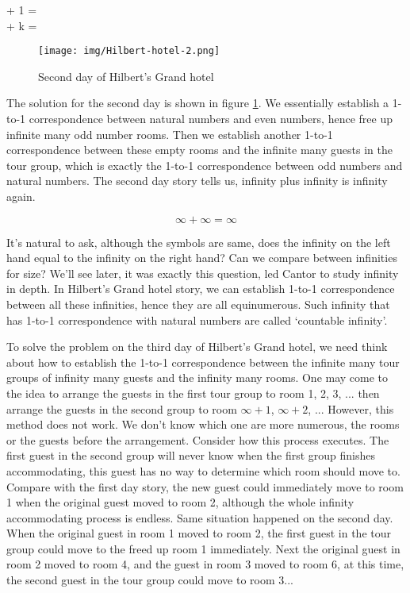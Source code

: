 \documentclass{article}
\begin{document}
\bean
\infty + 1 = \infty \\
\infty + k = \infty \\
\eean

\begin{figure}[htbp]
 \centering
 \texttt{[image: img/Hilbert-hotel-2.png]}
 \caption{Second day of Hilbert's Grand hotel}
 \label{fig:Hilbert-hotel-2}
\end{figure}

The solution for the second day is shown in figure \ref{fig:Hilbert-hotel-2}. We essentially establish a 1-to-1 correspondence between natural numbers and even numbers, hence free up infinite many odd number rooms. Then we establish another 1-to-1 correspondence between these empty rooms and the infinite many guests in the tour group, which is exactly the 1-to-1 correspondence between odd numbers and natural numbers. The second day story tells us, infinity plus infinity is infinity again.

\[
\infty + \infty = \infty
\]

It's natural to ask, although the symbols are same, does the infinity on the left hand equal to the infinity on the right hand? Can we compare between infinities for size? We'll see later, it was exactly this question, led Cantor to study infinity in depth. In Hilbert's Grand hotel story, we can establish 1-to-1 correspondence between all these infinities, hence they are all equinumerous. Such infinity that has 1-to-1 correspondence with natural numbers are called `countable infinity'.

To solve the problem on the third day of Hilbert's Grand hotel, we need think about how to establish the 1-to-1 correspondence between the infinite many tour groups of infinity many guests and the infinity many rooms. One may come to the idea to arrange the guests in the first tour group to room 1, 2, 3, ... then arrange the guests in the second group to room $\infty + 1$, $\infty + 2$, ... However, this method does not work. We don't know which one are more numerous, the rooms or the guests before the arrangement. Consider how this process executes. The first guest in the second group will never know when the first group finishes accommodating, this guest has no way to determine which room should move to. Compare with the first day story, the new guest could immediately move to room 1 when the original guest moved to room 2, although the whole infinity accommodating process is endless. Same situation happened on the second day. When the original guest in room 1 moved to room 2, the first guest in the tour group could move to the freed up room 1 immediately. Next the original guest in room 2 moved to room 4, and the guest in room 3 moved to room 6, at this time, the second guest in the tour group could move to room 3...
\end{document}
